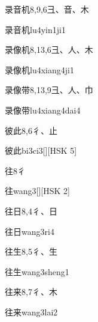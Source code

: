 \begin{entry}{录音机}{8,9,6}{⼹、⾳、⽊}
  \begin{phonetics}{录音机}{lu4yin1ji1}
  \end{phonetics}
\end{entry}

\begin{entry}{录像机}{8,13,6}{⼹、⼈、⽊}
  \begin{phonetics}{录像机}{lu4xiang4ji1}
  \end{phonetics}
\end{entry}

\begin{entry}{录像带}{8,13,9}{⼹、⼈、⼱}
  \begin{phonetics}{录像带}{lu4xiang4dai4}
  \end{phonetics}
\end{entry}

\begin{entry}{彼此}{8,6}{⼻、⽌}
  \begin{phonetics}{彼此}{bi3ci3}[][HSK 5]
  \end{phonetics}
\end{entry}

\begin{entry}{往}{8}{⼻}
  \begin{phonetics}{往}{wang3}[][HSK 2]
  \end{phonetics}
\end{entry}

\begin{entry}{往日}{8,4}{⼻、⽇}
  \begin{phonetics}{往日}{wang3ri4}
  \end{phonetics}
\end{entry}

\begin{entry}{往生}{8,5}{⼻、⽣}
  \begin{phonetics}{往生}{wang3sheng1}
  \end{phonetics}
\end{entry}

\begin{entry}{往来}{8,7}{⼻、⽊}
  \begin{phonetics}{往来}{wang3lai2}
  \end{phonetics}
\end{entry}

